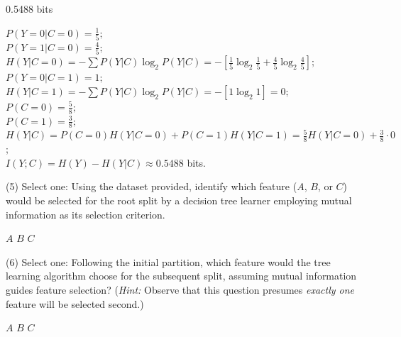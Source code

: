 \documentclass[11pt,addpoints,answers]{exam}
\begin{document}
\begin{questions}
		\begin{minipage}[t]{0.25\textwidth}
			\begin{answer_box}[title=$I(Y;C)$,height=6cm]
				0.5488 bits
			\end{answer_box}
		\end{minipage}
		\begin{minipage}[t]{0.7\textwidth}
			\begin{answer_box}[title=Work,height=6cm]
				$P(Y=0|C=0)=\frac15;$\\
				$P(Y=1|C=0)=\frac45;$\\
				$H(Y|C=0)=-\sum P(Y|C) \log_2 P(Y|C) = -[\frac15 \log_2 \frac15 + \frac45 \log_2 \frac45];$\\
				$P(Y=0|C=1)=1;$\\
				$H(Y|C=1)=-\sum P(Y|C) \log_2 P(Y|C) = -[1\log_2 1]=0;$\\
				$P(C=0)=\frac58;$\\
				$P(C=1)=\frac38;$\\
				$H(Y|C)=P(C=0)H(Y|C=0)+P(C=1)H(Y|C=1)=\frac58 H(Y|C=0)+\frac38 \cdot 0$;\\
				$I(Y;C) = H(Y) - H(Y|C) \approx 0.5488$ bits. \\
			\end{answer_box}
		\end{minipage}
		
		
		\item[(5)] Select one: Using the dataset provided, identify which feature ($A$, $B$, or $C$) would be selected for the root split by a decision tree learner employing mutual information as its selection criterion.
		
		\begin{checkboxes}
			\checkboxchar{$\Box$} \checkedchar{$\blacksquare$}
			\choice $A$
			\choice $B$
			\CorrectChoice $C$
		\end{checkboxes}
		
		
		\item[(6)] Select one: Following the initial partition, which feature would the tree learning algorithm choose for the subsequent split, assuming mutual information guides feature selection? (\emph{Hint:} Observe that this question presumes \emph{exactly one} feature will be selected second.)
		
		\begin{checkboxes}
			\checkboxchar{$\Box$} \checkedchar{$\blacksquare$}
			\choice $A$
			\CorrectChoice $B$
			\choice $C$
		\end{checkboxes}
		

\end{questions}
\end{document}
